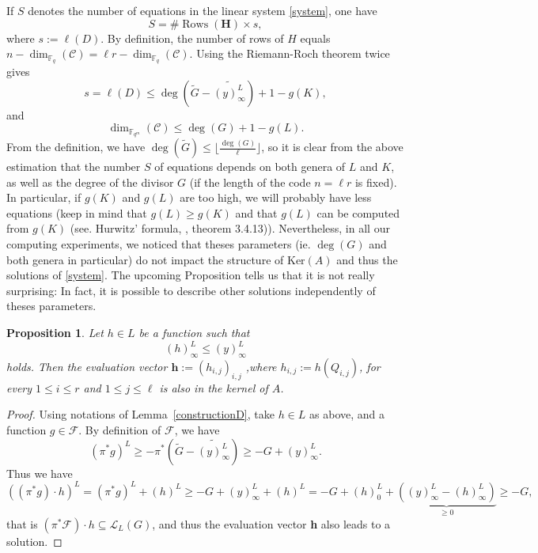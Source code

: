 \documentclass[10pt]{article}
\newtheorem{prop1}[thm]{Proposition}
\theoremstyle{definition}
\theoremstyle{definition}
\theoremstyle{definition}
\newcommand{\s}{\vspace{0.3cm}}
\newcommand{\cd}{\cdot}
\newcommand{\fqm}{\mathbb{F}_{q^m}}
\newcommand{\fq}{\mathbb{F}_q}
\newcommand{\su}{\subseteq}
\newcommand{\calL}{\mathcal{L}}
\begin{document}
\s 

If $S$ denotes the number of equations in the linear system \eqref{system}, one have 
\[S = \#\operatorname{Rows}(\mathbf{H}) \times s,\]
where $s := \ell( D)$. By definition, the number of rows of $H$ equals $n-\dim_{\fq}(\mathcal{C})= \ell r - \dim_{\fq}(\mathcal{C})$.
Using the Riemann-Roch theorem  twice gives 
\[s = \ell(D) \leq \deg\left( \tilde{G}-\widetilde{(y)^L_{\infty}}\right) +1 -  g(K) ,\]
and
\[\dim_{\fqm}(\mathcal{C}) \leq \deg(G)+1-g(L).\]
From the definition, we have $\deg(\tilde{G}) \leq \lfloor \frac{\deg(G)}{\ell} \rfloor$, so it is clear from the above estimation that the number $S$ of equations depends on both genera of $L$ and $K$, as well as the degree of the divisor $G$ (if the length of the code $n=\ell r$ is fixed). In particular, if $g(K)$ and $g(L)$ are too high, we will probably have less equations (keep in mind that $g(L) \geq g(K)$ and that $g(L)$ can be computed from $g(K)$ (see. Hurwitz' formula, \cite{Sti}, theorem 3.4.13)). 
\color{purple}
Nevertheless, in all our computing experiments, we noticed that theses parameters (ie. $\deg(G)$ and both genera in particular) do not impact the structure of $\mathrm{Ker}(A)$ and thus the solutions of \eqref{system}. The upcoming Proposition tells us that it is not really surprising: In fact, it is possible to describe other solutions independently of theses parameters.
\color{black}
\s

\begin{prop1} \label{othersolutions}
Let $h \in L$ be a function such that 
\[ (h)^L_{\infty} \leq (y)^L_{\infty}\]
holds. Then the evaluation vector $\mathbf{h}  := (h_{i,j})_{i,j}$ ,where $h_{i,j} := h(Q_{i,j})$, for every $1 \leq i \leq r$ and $1 \leq j \leq \ell$ is also in the kernel of $A$.
\end{prop1}

\s

\begin{proof}
Using notations of Lemma~\ref{constructionD}, take $h \in L$ as above, and a function $g \in \mathcal{F}$. By definition of $\mathcal{F}$, we have 
\[(\pi^*g)^L \geq -\pi^*\left(\tilde{G}-\widetilde{(y)^L_{\infty}}\right) \geq - G + (y)^L_{\infty}.\]
Thus we have 
\[((\pi^*g) \cd h)^L = (\pi^*g)^L  + (h)^L \geq -G + (y)^L_{\infty}+(h)^L = -G + (h)^L_0 + \underbrace{((y)^L_{\infty}-(h)^L_{\infty})}_{\geq 0} \geq -G,\]
that is $(\pi^*\mathcal{F})\cd h \su \calL_L(G)$, and thus the evaluation vector \textbf{h} also leads to a solution.

\end{proof}
\end{document}
